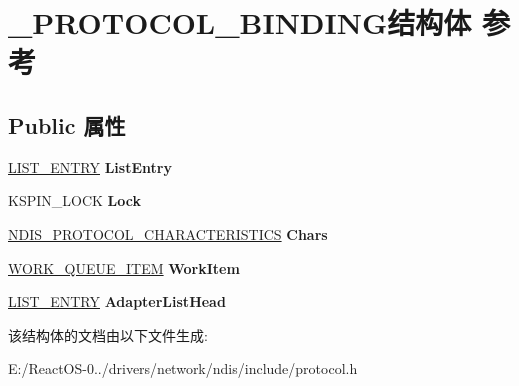 \hypertarget{struct___p_r_o_t_o_c_o_l___b_i_n_d_i_n_g}{}\section{\+\_\+\+P\+R\+O\+T\+O\+C\+O\+L\+\_\+\+B\+I\+N\+D\+I\+N\+G结构体 参考}
\label{struct___p_r_o_t_o_c_o_l___b_i_n_d_i_n_g}
\subsection*{Public 属性}
\begin{DoxyCompactItemize}
\item 
\mbox{\label{struct___p_r_o_t_o_c_o_l___b_i_n_d_i_n_g_a29b07673389eb10034a36a7670b05cd5}} 
\hyperlink{struct___l_i_s_t___e_n_t_r_y}{L\+I\+S\+T\+\_\+\+E\+N\+T\+RY} {\bfseries List\+Entry}
\item 
\mbox{\label{struct___p_r_o_t_o_c_o_l___b_i_n_d_i_n_g_a920ba6ddbad574a722f679e79cc8b7b3}} 
K\+S\+P\+I\+N\+\_\+\+L\+O\+CK {\bfseries Lock}
\item 
\mbox{\label{struct___p_r_o_t_o_c_o_l___b_i_n_d_i_n_g_a802267bd334985daedd558e26243798b}} 
\hyperlink{struct___n_d_i_s40___p_r_o_t_o_c_o_l___c_h_a_r_a_c_t_e_r_i_s_t_i_c_s}{N\+D\+I\+S\+\_\+\+P\+R\+O\+T\+O\+C\+O\+L\+\_\+\+C\+H\+A\+R\+A\+C\+T\+E\+R\+I\+S\+T\+I\+CS} {\bfseries Chars}
\item 
\mbox{\label{struct___p_r_o_t_o_c_o_l___b_i_n_d_i_n_g_a8017f2e2202086c724543dfc56a38d6b}} 
\hyperlink{struct___w_o_r_k___q_u_e_u_e___i_t_e_m}{W\+O\+R\+K\+\_\+\+Q\+U\+E\+U\+E\+\_\+\+I\+T\+EM} {\bfseries Work\+Item}
\item 
\mbox{\label{struct___p_r_o_t_o_c_o_l___b_i_n_d_i_n_g_ab93ee7ab992dc488d1a76899df6f997d}} 
\hyperlink{struct___l_i_s_t___e_n_t_r_y}{L\+I\+S\+T\+\_\+\+E\+N\+T\+RY} {\bfseries Adapter\+List\+Head}
\end{DoxyCompactItemize}


该结构体的文档由以下文件生成\+:\begin{DoxyCompactItemize}
\item 
E\+:/\+React\+O\+S-\/0../drivers/network/ndis/include/protocol.\+h\end{DoxyCompactItemize}
